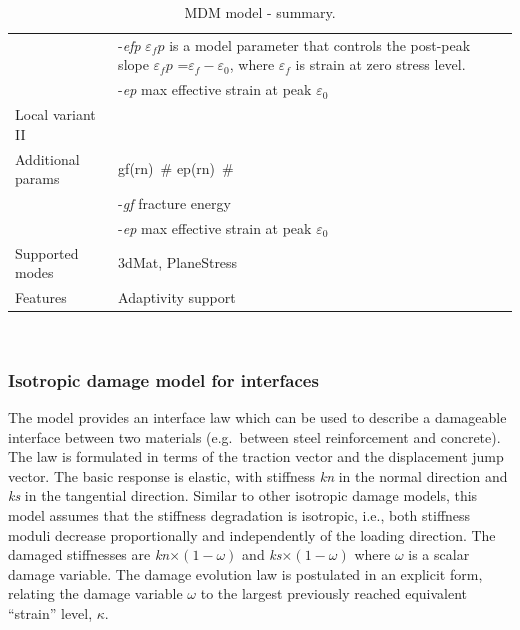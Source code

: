 \documentclass[a4paper]{article}
\newcommand{\elemparam}[2]{{{#1\tiny (#2)}~\#}}
\newcommand{\param}[1]{{\it #1}}
\newenvironment{mmt}{\begin{tabular}{|l|p{9cm}|}}{\end{tabular}\\}
\newenvironment{mmt}{\begin{tabular}{|l|l|}}{\end{tabular}\\}
\begin{document}
\begin{table}[!htb]
\begin{mmt}
& -\param{efp} $\varepsilon_fp$ is a model parameter that controls
the post-peak slope $\varepsilon_fp$ =$\varepsilon_f-\varepsilon_0$,
where $\varepsilon_f$ is strain at zero stress level.\\
& -\param{ep} max effective strain at peak $\varepsilon_0$\\
\hline
Local variant II&\\
Additional params &\elemparam{gf}{rn} \elemparam{ep}{rn}\\
& -\param{gf} fracture energy\\
& -\param{ep} max effective strain at peak $\varepsilon_0$\\
\hline
Supported modes& 3dMat, PlaneStress\\
Features & Adaptivity support\\
\hline
\end{mmt}
\caption{MDM model - summary.}
\label{mdm_table}
\end{table}

\clearpage
\subsubsection{Isotropic damage model for interfaces}
\label{sec:idmfi}

The model provides an interface law which can be used to describe a damageable interface between two materials (e.g.\ between steel reinforcement and concrete). The law is formulated in terms of the traction vector and the displacement jump vector. The basic response is elastic, with stiffness \param{kn} in 
the normal direction and \param{ks} in the tangential direction.
Similar to other isotropic damage models, this model assumes that the stiffness degradation is isotropic, i.e., both stiffness moduli decrease proportionally and independently of the loading 
direction. The damaged stiffnesses are \param{kn}$\times(1-\omega)$ and \param{ks}$\times(1-\omega)$ where $\omega$ is a scalar damage variable.
The damage evolution law is postulated in an explicit form, relating
the damage variable $\omega$ to the largest previously reached 
equivalent ``strain'' level, $\kappa$.
\end{document}
